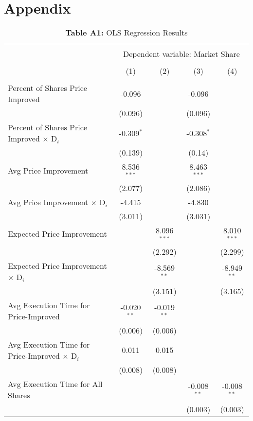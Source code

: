 \documentclass[12pt,a4paper]{article}
\begin{document}
\section{Appendix}

\begin{table}[h] 
	\caption*{\textbf{Table A1:} OLS Regression Results}
	\label{} 
	\centering
	\footnotesize
	\begin{tabular}{@{\extracolsep{1.39em}}lcccc} 
		\\[-4ex]\hline 
		\hline \\[-2ex] 
		& \multicolumn{4}{c}{Dependent variable: Market Share} \\ 
		\cline{2-5} \\[-2ex]
		& (1) & (2) & (3) & (4) \\[.4ex]  
		\hline \\[-1.8ex] 
		Percent of Shares Price Improved & -0.096 &  & -0.096 & \\
		& (0.096) &  & (0.096) & \\ [0.5ex]
		Percent of Shares Price Improved $\times$ D$_i$ & -0.309$^{*}$ &  & -0.308$^{*}$ & \\
		& (0.139) &  & (0.14) & \\ [0.5ex]
		Avg Price Improvement & 8.536$^{***}$ &  & 8.463$^{***}$ & \\
		& (2.077) &  & (2.086) & \\ [0.5ex]
		Avg Price Improvement $\times$ D$_i$ & -4.415 &  & -4.830 & \\
		& (3.011) &  & (3.031) & \\ [0.5ex]
		Expected Price Improvement &  & 8.096$^{***}$ &  & 8.010$^{***}$\\
		&  & (2.292) &  & (2.299)\\ [0.5ex]
		Expected Price Improvement $\times$ D$_i$  &  & -8.569$^{**}$ &  & -8.949$^{**}$\\
		&  & (3.151) &  & (3.165)\\ [0.5ex]
		Avg Execution Time for Price-Improved & -0.020$^{**}$ & -0.019$^{**}$ &  & \\
		& (0.006) & (0.006) &  & \\ [0.5ex]
		Avg Execution Time for Price-Improved  $\times$ D$_i$  & 0.011 & 0.015 &  & \\
		& (0.008) & (0.008) &  & \\ [0.5ex]
		Avg Execution Time for All Shares &  &  & -0.008$^{**}$ & -0.008$^{**}$\\
		&  &  & (0.003) & (0.003)\\ [0.5ex]

\end{tabular}
\end{table}
\end{document}
